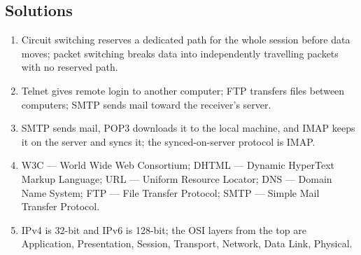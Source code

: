 \documentclass[11pt]{article}
\begin{document}
\subsection*{Solutions}
\begingroup\small
\begin{enumerate}[label=\arabic*.]
  \item Circuit switching reserves a dedicated path for the whole session
    before data moves; packet switching breaks data into independently
    travelling packets with no reserved path.
  \item Telnet gives remote login to another computer; FTP transfers files
    between computers; SMTP sends mail toward the receiver's server.
  \item SMTP sends mail, POP3 downloads it to the local machine, and IMAP
    keeps it on the server and syncs it; the synced-on-server protocol is
    IMAP.
  \item W3C --- World Wide Web Consortium; DHTML --- Dynamic HyperText Markup
    Language; URL --- Uniform Resource Locator; DNS --- Domain Name System;
    FTP --- File Transfer Protocol; SMTP --- Simple Mail Transfer Protocol.
  \item IPv4 is 32-bit and IPv6 is 128-bit; the OSI layers from the top are
    Application, Presentation, Session, Transport, Network, Data Link,
    Physical.
\end{enumerate}
\endgroup
\end{document}
